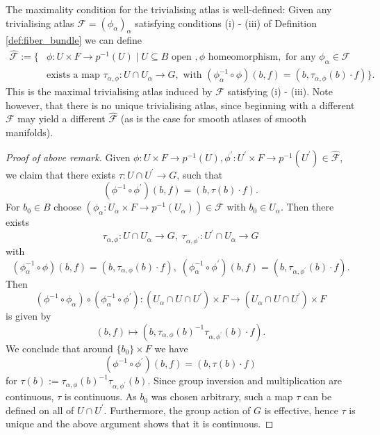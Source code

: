 \begin{remark}
    The maximality condition for the trivialising atlas is well-defined: Given any trivialising atlas $\mathcal{F} = (\phi_\alpha)_\alpha$ satisfying conditions (i) - (iii) of Definition \ref{def:fiber_bundle} we can define
    \begin{align*}
        \hat{\mathcal{F}} := \{& \phi \colon U \times F \to p^{-1}(U) \mid U \subseteq B \text{ open }, \phi \text{ homeomorphism},  \text{ for any } \phi_\alpha \in \mathcal{F} \\ &\text{exists a map } \tau_{\alpha,\phi} \colon U \cap U_\alpha \to G, \text{ with } (\phi_\alpha^{-1} \circ \phi)(b,f) = (b,\tau_{\alpha,\phi}(b) \cdot f) \}.
    \end{align*}
    This is the maximal trivialising atlas induced by $\mathcal{F}$ satisfying (i) - (iii). Note however, that there is no unique trivialising atlas, since beginning with a different $\mathcal{F}$ may yield a different $\hat{\mathcal{F}}$ (as is the case for smooth atlases of smooth manifolds).
    \begin{proof}[Proof of above remark]
        Given $\phi \colon U \times F \to p^{-1}(U), \phi^\prime \colon U^\prime \times F \to p^{-1}(U^\prime) \in \hat{\mathcal{F}}$, we claim that there exists $\tau \colon U \cap U^\prime \to G$, such that
        \[
        (\phi^{-1} \circ \phi^\prime)(b,f) = (b,\tau(b) \cdot f).
        \]
        For $b_0 \in B$ choose $(\phi_\alpha \colon U_\alpha \times F \to p^{-1}(U_\alpha)) \in \mathcal{F}$ with $b_0 \in U_\alpha$. Then there exists
        \[
        \tau_{\alpha,\phi} \colon U \cap U_\alpha \to G, \; \tau_{\alpha,\phi^\prime} \colon U^\prime \cap U_\alpha \to G
        \]
        with
        \[
        (\phi^{-1}_\alpha \circ \phi)(b,f) = (b,\tau_{\alpha,\phi}(b) \cdot f), \; 
        (\phi^{-1}_\alpha \circ \phi^\prime)(b,f) = (b,\tau_{\alpha,\phi^\prime}(b) \cdot f).
        \]
        Then
        \[
        (\phi^{-1} \circ \phi_\alpha) \circ (\phi_\alpha^{-1} \circ \phi^\prime) \colon (U_\alpha \cap U \cap U^\prime) \times F \to (U_\alpha \cap U \cap U^\prime) \times F 
        \]
        is given by
        \[
        (b,f) \mapsto (b, \tau_{\alpha,\phi}(b)^{-1}\tau_{\alpha,\phi^\prime}(b) \cdot f).
        \]
        We conclude that around $\{b_0\} \times F$ we have
        \[
        (\phi^{-1} \circ \phi^\prime)(b,f) = (b,\tau(b) \cdot f)
        \]
        for $\tau(b) := \tau_{\alpha,\phi}(b)^{-1}\tau_{\alpha,\phi^\prime}(b)$. Since group inversion and multiplication are continuous, $\tau$ is continuous. As $b_0$ was chosen arbitrary, such a map $\tau$ can be defined on all of $U \cap U^\prime$. Furthermore, the group action of $G$ is effective, hence $\tau$ is unique and the above argument shows that it is continuous. 
    \end{proof}
\end{remark}

